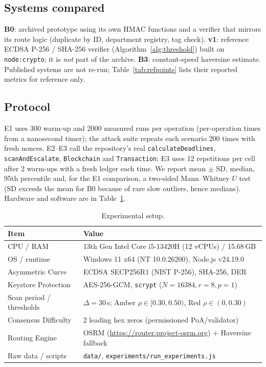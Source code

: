 \documentclass[journal]{IEEEtran}
\begin{document}
\subsection{Systems compared}
\textbf{B0}: archived prototype using its own HMAC functions and a verifier
that mirrors its route logic (duplicate by ID, department registry, tag
check). \textbf{v1}: reference ECDSA P-256 / SHA-256 verifier
(Algorithm~\ref{alg:threshold}) built on \texttt{node:crypto}; it is
\emph{not} part of the archive. \textbf{B3}: constant-speed haversine
estimate. Published systems are not re-run; Table~\ref{tab:refpoints} lists
their reported metrics for reference only.

\subsection{Protocol}
E1 uses 300 warm-up and 2000 measured runs per operation (per-operation
times from a nanosecond timer); the attack suite repeats each scenario 200
times with fresh nonces. E2--E3 call the repository's real
\texttt{calculateDeadlines}, \texttt{scanAndEscalate}, \texttt{Blockchain} and
\texttt{Transaction}; E3 uses 12 repetitions per cell after 2 warm-ups with a
fresh ledger each time. We report mean $\pm$ SD, median, 95th percentile and,
for the E1 comparison, a two-sided Mann--Whitney $U$ test (SD exceeds the mean
for B0 because of rare slow outliers, hence medians). Hardware
and software are in Table~\ref{tab:setup}.

\begin{table}[t]
\centering
\caption{Experimental setup.}
\label{tab:setup}
\footnotesize
\begin{tabular}{@{}ll@{}}
\toprule
Item & Value \\
\midrule
CPU / RAM & 13th Gen Intel Core i5-13420H (12 vCPUs) / 15.68\,GB \\
OS / runtime & Windows 11 x64 (NT 10.0.26200), Node.js v24.19.0 \\
Asymmetric Curve & ECDSA SECP256R1 (NIST P-256), SHA-256, DER \\
Keystore Protection & AES-256-GCM, \texttt{scrypt} ($N=16384, r=8, p=1$) \\
Scan period / thresholds & $\Delta=30$\,s; Amber $\rho\in[0.30,0.50)$, Red $\rho\in(0,0.30)$ \\
Consensus Difficulty & 2 leading hex zeros (permissioned PoA/validator) \\
Routing Engine & OSRM (\url{https://router.project-osrm.org}) + Haversine fallback \\
Raw data / scripts & \texttt{data/}, \texttt{experiments/run\_experiments.js} \\
\bottomrule
\end{tabular}
\end{table}
\end{document}

